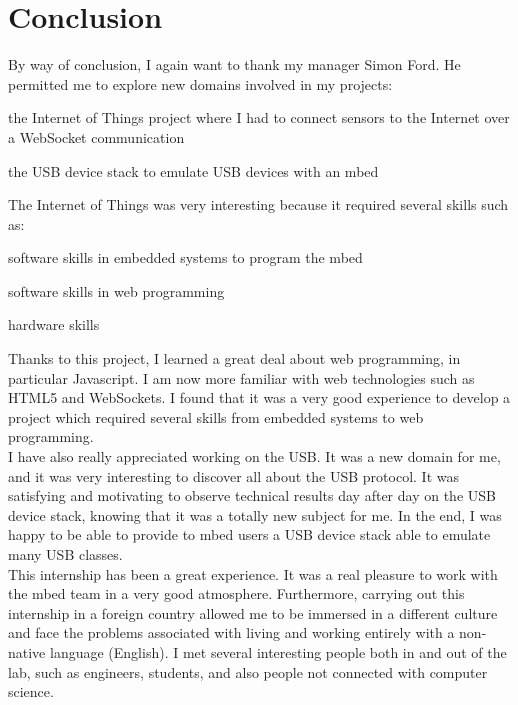 \documentclass[pdftex,10pt,a4paper]{report}
\newenvironment{packed_item}{
\begin{itemize}
  \setlength{\itemsep}{1pt}
  \setlength{\parskip}{0pt}
  \setlength{\parsep}{0pt}
}{\end{itemize}}
\begin{document}
\chapter{Conclusion}
By way of conclusion, I again want to thank my manager Simon Ford. He permitted me to explore new domains involved in my projects:
\begin{packed_item}
	\item the Internet of Things project where I had to connect sensors to the Internet over a WebSocket communication
	\item the USB device stack to emulate USB devices with an mbed
\end{packed_item}

The Internet of Things was very interesting because it required several skills such as:
\begin{packed_item}
	\item software skills in embedded systems to program the mbed
	\item software skills in web programming
	\item hardware skills
\end{packed_item}


Thanks to this project, I learned a great deal about web programming, in particular Javascript. I am now more familiar with web technologies such as HTML5 and WebSockets. I found that it was a very good experience to develop a project which required several skills from embedded systems to web programming. \\


I have also really appreciated working on the USB. It was a new domain for me, and it was very interesting to discover all about the USB protocol. It was satisfying and motivating to observe technical results day after day on the USB device stack, knowing that it was a totally new subject for me. In the end, I was happy to be able to provide to mbed users a USB device stack able to emulate many USB classes. \\


This internship has been a great experience. It was a real pleasure to work with the mbed team in a very good atmosphere. Furthermore, carrying out this
internship in a foreign country allowed me to be immersed in a different culture and face the problems associated with living and working entirely with a non-native language (English). I met several interesting people both in and out of the lab, such as engineers, students, and also people not connected with computer science.
\end{document}
